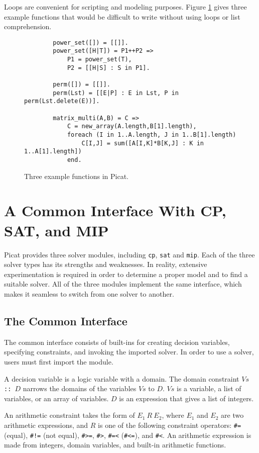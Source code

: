\documentclass{new_tlp}
\begin{document}
Loops are convenient for scripting and modeling purposes. Figure \ref{fig:loops} gives three example functions that would be difficult to write without using loops or list comprehension.

\begin{figure}[tb]
\begin{center}
\begin{verbatim}
        power_set([]) = [[]].
        power_set([H|T]) = P1++P2 =>
            P1 = power_set(T),
            P2 = [[H|S] : S in P1].

        perm([]) = [[]].
        perm(Lst) = [[E|P] : E in Lst, P in perm(Lst.delete(E))].

        matrix_multi(A,B) = C =>
            C = new_array(A.length,B[1].length),
            foreach (I in 1..A.length, J in 1..B[1].length)
                C[I,J] = sum([A[I,K]*B[K,J] : K in 1..A[1].length])
            end.
\end{verbatim}
\end{center}
\caption{\label{fig:loops}Three example functions in Picat.}
\end{figure}

\section{A Common Interface With CP, SAT, and MIP}
Picat provides three solver modules, including \texttt{cp}, \texttt{sat} and \texttt{mip}. Each of the three solver types has its strengths and weaknesses. In reality, extensive experimentation is required in order to determine a proper model and to find a suitable solver. All of the three modules implement the same interface, which makes it seamless to switch from one solver to another.

\subsection{The Common Interface}
The common interface consists of built-ins for creating decision variables, specifying constraints, and invoking the imported solver. In order to use a solver, users must first import the module.

A decision variable is a logic variable with a domain. The domain constraint {\tt $Vs$ :: $D$} narrows the domains of the variables $Vs$ to $D$. $Vs$ is a variable, a list of variables, or an array of variables. $D$ is an expression that gives a list of integers. 

An arithmetic constraint takes the form of $E_1\ R\ E_2$, where $E_1$ and $E_2$ are two arithmetic expressions, and $R$ is one of the following constraint operators: \verb+#=+ (equal), \verb+#!=+ (not equal), \verb+#>=+, \verb+#>+, \verb+#=<+ (\verb+#<=+), and \verb+#<+. An arithmetic expression is made from integers, domain variables, and built-in arithmetic functions.
\end{document}
